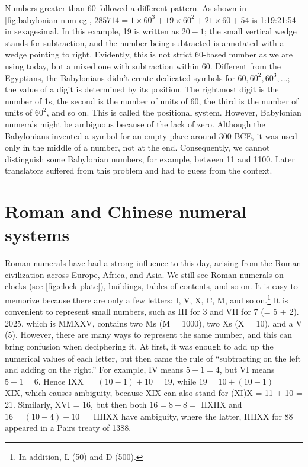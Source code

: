 \documentclass[b5paper]{article}
\begin{document}
Numbers greater than 60 followed a different pattern. As shown in \cref{fig:babylonian-num-eg}, $285714 = 1 \times 60^3 + 19 \times 60^2 + 21 \times 60 + 54$ is 1:19:21:54 in sexagesimal. In this example, 19 is written as $20 - 1$; the small vertical wedge stands for subtraction, and the number being subtracted is annotated with a wedge pointing to right. Evidently, this is not strict 60-based number as we are using today, but a mixed one with subtraction within 60. Different from the Egyptians, the Babylonians didn't create dedicated symbols for $60, 60^2, 60^3, \dotsc$; the value of a digit is determined by its position. The rightmost digit is the number of 1s, the second is the number of units of 60, the third is the number of units of $60^2$, and so on. This is called the positional system. However, Babylonian numerals might be ambiguous because of the lack of zero. Although the Babylonians invented a symbol for an empty place around 300 BCE, it was used only in the middle of a number, not at the end. Consequently, we cannot distinguish some Babylonian numbers, for example, between 11 and 1100. Later translators suffered from this problem and had to guess from the context.

\section{Roman and Chinese numeral systems}
  

Roman numerals have had a strong influence to this day, arising from the Roman civilization across Europe, Africa, and Asia. We still see Roman numerals on clocks (see \cref{fig:clock-plate}), buildings, tables of contents, and so on. It is easy to memorize because there are only a few letters: I, V, X, C, M, and so on.\footnote{In addition, L (50) and D (500).} It is convenient to represent small numbers, such as III for 3 and VII for 7 (= 5 + 2). 2025, which is MMXXV, contains two Ms (M = 1000), two Xs (X = 10), and a V (5). However, there are many ways to represent the same number, and this can bring confusion when deciphering it. At first, it was enough to add up the numerical values of each letter, but then came the rule of \enquote{subtracting on the left and adding on the right.} For example, IV means $5 - 1 = 4$, but VI means $5 + 1 = 6$. Hence IXX $= (10 - 1) + 10 = 19$, while $19 = 10 + (10 - 1) =$ XIX, which causes ambiguity, because XIX can also stand for (XI)X = 11 + 10 = 21. Similarly, XVI = 16, but then both $16 = 8 + 8 =$ IIXIIX and $16 = (10 - 4) + 10 =$ IIIIXX have ambiguity, where the latter, IIIIXX for 88 appeared in a Pairs treaty of 1388\cite{LeVeque-Smith-25}.
\end{document}
